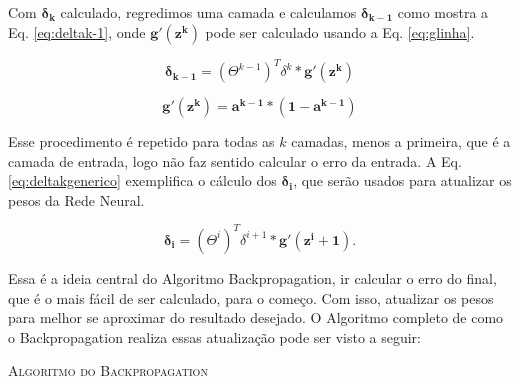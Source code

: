 Com $\mathbf{\delta_k}$ calculado, regredimos uma camada e calculamos $\mathbf{\delta_{k-1}}$ como mostra a Eq. \ref{eq:deltak-1}, onde $\mathbf{g'(z^k)}$ pode ser calculado usando a Eq. \ref{eq:glinha}.

\begin{equation}
\label{eq:deltak-1}
\mathbf{\delta_{k-1}} = (\Theta^{k-1})^T \delta^{k} * \mathbf{g'(z^k)}
\end{equation}
  
\begin{equation}
\label{eq:glinha}
\mathbf{g'(z^k)} = \mathbf{a^{k-1}*(1-a^{k-1})}
\end{equation}

Esse procedimento é repetido para todas as $k$ camadas, menos a primeira, que é a camada de entrada, logo não faz sentido calcular o erro da entrada. A Eq. \ref{eq:deltakgenerico} exemplifica o cálculo dos $\mathbf{\delta_{i}}$, que serão usados para atualizar os pesos da Rede Neural.  

\begin{equation}
\label{eq:deltakgenerico}
\mathbf{\delta_{i}} = (\Theta^{i})^T \delta^{i+1} * \mathbf{g'(z^i+1)}.
\end{equation}
 
 Essa é a ideia central do Algoritmo Backpropagation, ir calcular o erro do final, que é o mais fácil de ser calculado, para o começo. Com isso, atualizar os pesos para melhor se aproximar do resultado desejado. O Algoritmo completo de como o Backpropagation realiza essas atualização pode ser visto a seguir:
 
 \begin{algorithm}[H]
   \SetAlgoLined
   \Saida{$\Theta$}
   \Retorna{$\Theta$}
   \label{alg:BP}
   \caption{\textsc{Algoritmo do Backpropagation }}
 \end{algorithm}

